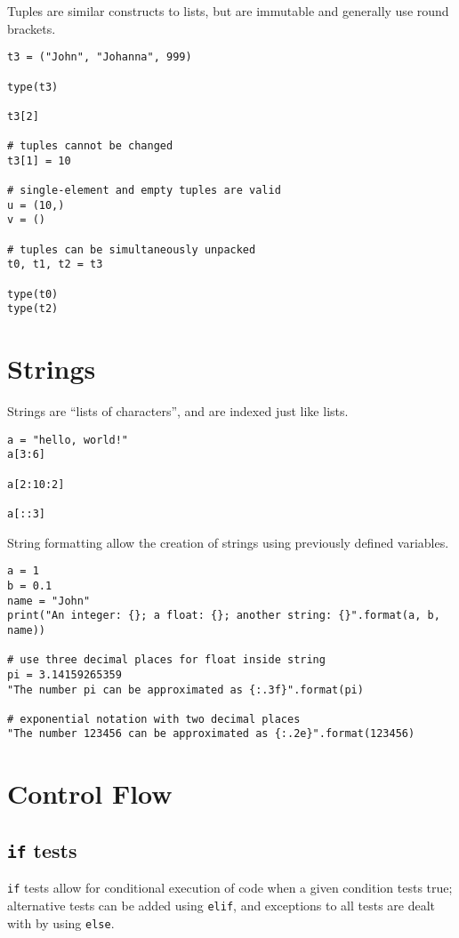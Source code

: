 Tuples are similar constructs to lists, but are immutable and generally use round brackets.

\begin{lstlisting}[frame=single]
t3 = ("John", "Johanna", 999)

type(t3)

t3[2]

# tuples cannot be changed
t3[1] = 10

# single-element and empty tuples are valid
u = (10,)
v = ()

# tuples can be simultaneously unpacked
t0, t1, t2 = t3

type(t0)
type(t2)
\end{lstlisting}

\section{Strings}

Strings are ``lists of characters'', and are indexed just like lists.

\begin{lstlisting}[frame=single]
a = "hello, world!"
a[3:6]

a[2:10:2]

a[::3]
\end{lstlisting}

String formatting allow the creation of strings using previously defined variables.

\begin{lstlisting}[frame=single]
a = 1
b = 0.1
name = "John"
print("An integer: {}; a float: {}; another string: {}".format(a, b, name))

# use three decimal places for float inside string
pi = 3.14159265359
"The number pi can be approximated as {:.3f}".format(pi)

# exponential notation with two decimal places
"The number 123456 can be approximated as {:.2e}".format(123456)
\end{lstlisting}

\section{Control Flow}

\subsection{{\tt if} tests}
{\tt if} tests allow for conditional execution of code when a given condition tests true; alternative tests can be added using {\tt elif}, and exceptions to all tests are dealt with by using {\tt else}.

